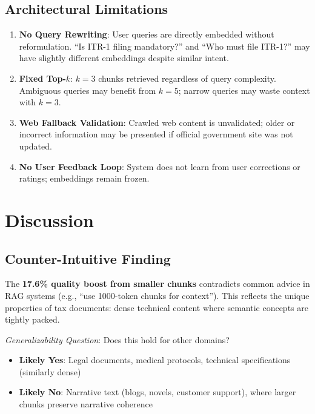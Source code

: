 \documentclass[11pt,a4paper]{article}
\begin{document}
\subsection{Architectural Limitations}

\begin{enumerate}
    \item \textbf{No Query Rewriting}: User queries are directly embedded without reformulation. ``Is ITR-1 filing mandatory?'' and ``Who must file ITR-1?'' may have slightly different embeddings despite similar intent.
    
    \item \textbf{Fixed Top-$k$}: $k=3$ chunks retrieved regardless of query complexity. Ambiguous queries may benefit from $k=5$; narrow queries may waste context with $k=3$.
    
    \item \textbf{Web Fallback Validation}: Crawled web content is unvalidated; older or incorrect information may be presented if official government site was not updated.
    
    \item \textbf{No User Feedback Loop}: System does not learn from user corrections or ratings; embeddings remain frozen.
\end{enumerate}

\section{Discussion}
\label{sec:discussion}

\subsection{Counter-Intuitive Finding}

The \textbf{17.6\% quality boost from smaller chunks} contradicts common advice in RAG systems (e.g., ``use 1000-token chunks for context''). This reflects the unique properties of tax documents: dense technical content where semantic concepts are tightly packed.

\textit{Generalizability Question}: Does this hold for other domains?
\begin{itemize}
    \item \textbf{Likely Yes}: Legal documents, medical protocols, technical specifications (similarly dense)
    \item \textbf{Likely No}: Narrative text (blogs, novels, customer support), where larger chunks preserve narrative coherence
\end{itemize}
\end{document}

